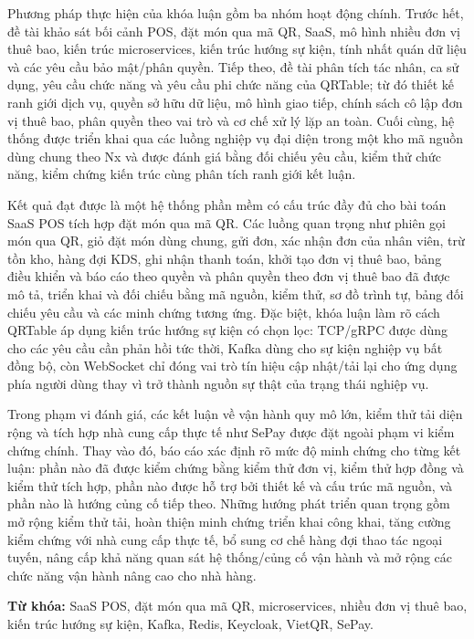 Phương pháp thực hiện của khóa luận gồm ba nhóm hoạt động chính. Trước hết, đề tài khảo sát bối cảnh POS, đặt món qua mã QR, SaaS, mô hình nhiều đơn vị thuê bao, kiến trúc microservices, kiến trúc hướng sự kiện, tính nhất quán dữ liệu và các yêu cầu bảo mật/phân quyền. Tiếp theo, đề tài phân tích tác nhân, ca sử dụng, yêu cầu chức năng và yêu cầu phi chức năng của QRTable; từ đó thiết kế ranh giới dịch vụ, quyền sở hữu dữ liệu, mô hình giao tiếp, chính sách cô lập đơn vị thuê bao, phân quyền theo vai trò và cơ chế xử lý lặp an toàn. Cuối cùng, hệ thống được triển khai qua các luồng nghiệp vụ đại diện trong một kho mã nguồn dùng chung theo Nx và được đánh giá bằng đối chiếu yêu cầu, kiểm thử chức năng, kiểm chứng kiến trúc cùng phân tích ranh giới kết luận.

Kết quả đạt được là một hệ thống phần mềm có cấu trúc đầy đủ cho bài toán SaaS POS tích hợp đặt món qua mã QR. Các luồng quan trọng như phiên gọi món qua QR, giỏ đặt món dùng chung, gửi đơn, xác nhận đơn của nhân viên, trừ tồn kho, hàng đợi KDS, ghi nhận thanh toán, khởi tạo đơn vị thuê bao, bảng điều khiển và báo cáo theo quyền và phân quyền theo đơn vị thuê bao đã được mô tả, triển khai và đối chiếu bằng mã nguồn, kiểm thử, sơ đồ trình tự, bảng đối chiếu yêu cầu và các minh chứng tương ứng. Đặc biệt, khóa luận làm rõ cách QRTable áp dụng kiến trúc hướng sự kiện có chọn lọc: TCP/gRPC được dùng cho các yêu cầu cần phản hồi tức thời, Kafka dùng cho sự kiện nghiệp vụ bất đồng bộ, còn WebSocket chỉ đóng vai trò tín hiệu cập nhật/tải lại cho ứng dụng phía người dùng thay vì trở thành nguồn sự thật của trạng thái nghiệp vụ.

Trong phạm vi đánh giá, các kết luận về vận hành quy mô lớn, kiểm thử tải diện rộng và tích hợp nhà cung cấp thực tế như SePay được đặt ngoài phạm vi kiểm chứng chính. Thay vào đó, báo cáo xác định rõ mức độ minh chứng cho từng kết luận: phần nào đã được kiểm chứng bằng kiểm thử đơn vị, kiểm thử hợp đồng và kiểm thử tích hợp, phần nào được hỗ trợ bởi thiết kế và cấu trúc mã nguồn, và phần nào là hướng củng cố tiếp theo. Những hướng phát triển quan trọng gồm mở rộng kiểm thử tải, hoàn thiện minh chứng triển khai công khai, tăng cường kiểm chứng với nhà cung cấp thực tế, bổ sung cơ chế hàng đợi thao tác ngoại tuyến, nâng cấp khả năng quan sát hệ thống/củng cố vận hành và mở rộng các chức năng vận hành nâng cao cho nhà hàng.

\textbf{Từ khóa:} SaaS POS, đặt món qua mã QR, microservices, nhiều đơn vị thuê bao, kiến trúc hướng sự kiện, Kafka, Redis, Keycloak, VietQR, SePay.

\cleardoublepage
